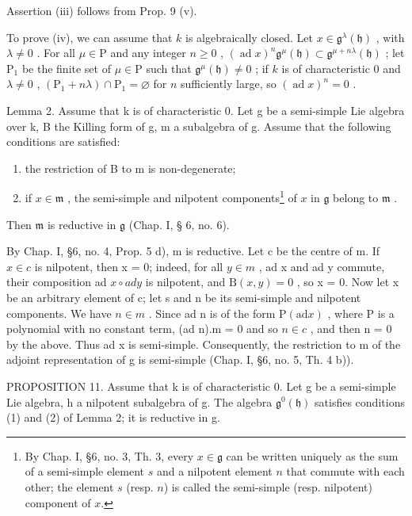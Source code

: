 Assertion (iii) follows from Prop. 9 (v).

To prove (iv), we can assume that \(k\) is algebraically closed. Let \(x \in \mathfrak{g}^{\lambda}(\mathfrak{h})\) , with \(\lambda \neq 0\) . For all \(\mu \in \mathrm{P}\) and any integer \(n \geq 0\) , \((\operatorname{ad} x)^n \mathfrak{g}^\mu(\mathfrak{h}) \subset \mathfrak{g}^{\mu + n\lambda}(\mathfrak{h})\) ; let \(\mathrm{P}_1\) be the finite set of \(\mu \in \mathrm{P}\) such that \(\mathfrak{g}^\mu(\mathfrak{h}) \neq 0\) ; if \(k\) is of characteristic 0 and \(\lambda \neq 0\) , \((\mathrm{P}_1 + n\lambda) \cap \mathrm{P}_1 = \varnothing\) for \(n\) sufficiently large, so \((\operatorname{ad} x)^n = 0\) .

Lemma 2. Assume that k is of characteristic 0. Let g be a semi-simple Lie algebra over k, B the Killing form of g, m a subalgebra of g. Assume that the following conditions are satisfied:

\begin{enumerate}
\def\labelenumi{\arabic{enumi})}
\item
  the restriction of B to m is non-degenerate;
\item
  if \(x \in \mathfrak{m}\) , the semi-simple and nilpotent components\footnote{By Chap. I, §6, no. 3, Th. 3, every \(x \in \mathfrak{g}\) can be written uniquely as the sum of a semi-simple element \(s\) and a nilpotent element \(n\) that commute with each other; the element \(s\) (resp. \(n\)) is called the semi-simple (resp. nilpotent) component of \(x\).} of \(x\) in \(\mathfrak{g}\) belong to \(\mathfrak{m}\) .
\end{enumerate}

Then \(\mathfrak{m}\) is reductive in \(\mathfrak{g}\) (Chap. I, § 6, no. 6).

By Chap. I, §6, no. 4, Prop. 5 d), m is reductive. Let c be the centre of m. If \(x \in c\) is nilpotent, then x = 0; indeed, for all \(y \in m\) , ad x and ad y commute, their composition ad \(x \circ ad y\) is nilpotent, and \(\mathrm{B}(x, y) = 0\) , so x = 0. Now let x be an arbitrary element of c; let s and n be its semi-simple and nilpotent components. We have \(n \in m\) . Since ad n is of the form \(\mathrm{P}(\mathrm{ad}x)\) , where P is a polynomial with no constant term, (ad n).m = 0 and so \(n \in c\) , and then n = 0 by the above. Thus ad x is semi-simple. Consequently, the restriction to m of the adjoint representation of g is semi-simple (Chap. I, §6, no. 5, Th. 4 b)).

PROPOSITION 11. Assume that k is of characteristic 0. Let g be a semi-simple Lie algebra, h a nilpotent subalgebra of g. The algebra \(\mathfrak{g}^{0}(\mathfrak{h})\) satisfies conditions (1) and (2) of Lemma 2; it is reductive in g.

